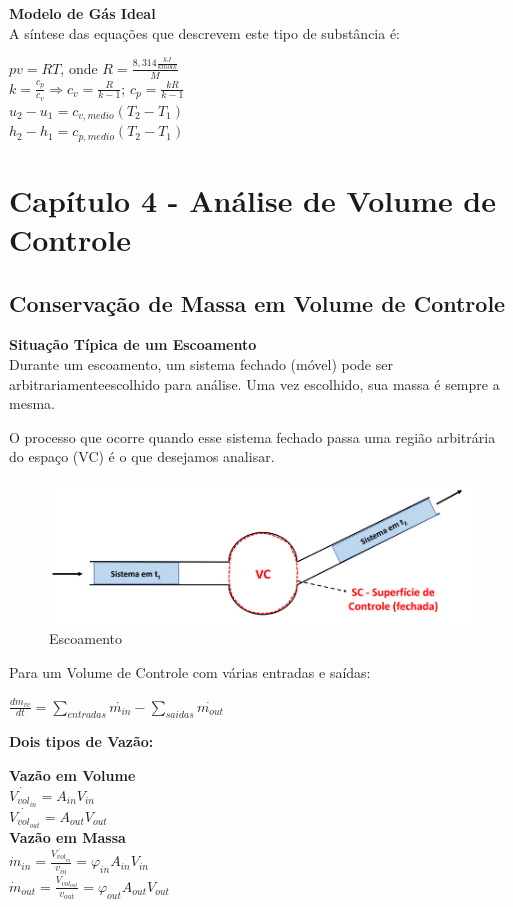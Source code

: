 \documentclass[a4paper, 12pt]{article}
\begin{document}
\textbf{Modelo de Gás Ideal}\\
A síntese das equações que descrevem este tipo de substância é:
	\begin{center}
		\large
		$ pv = RT $, onde $ R = \frac{8,314 \frac{kJ}{kmol k}}{M} $\\
		$ k = \frac{c_p}{c_v} \Rightarrow c_v = \frac{R}{k - 1} $; $c_p = \frac{kR}{k - 1} $\\
		$ u_2 - u_1 = c_{v,medio}(T_2-T_1) $\\
		$ h_2-h_1 = c_{p,medio}(T_2-T_1) $
	\end{center}


\newpage
\section{Capítulo 4 - Análise de Volume de Controle}
\subsection{Conservação de Massa em Volume de Controle}
\textbf{Situação Típica de um Escoamento}\\
Durante um escoamento, um sistema fechado (móvel) pode ser arbitrariamenteescolhido para análise. Uma vez escolhido, sua massa é sempre a mesma.

O processo que ocorre quando esse sistema fechado passa uma região arbitrária
do espaço (VC) é o que desejamos analisar.
	\begin{figure}[h]
		\includegraphics[width = 12cm]{vcc.png}
		\centering
		\caption{Escoamento}
	\end{figure}
	
Para um Volume de Controle com várias entradas e saídas:
	\begin{center}
		\large
		$ \frac{dm_{vc}}{dt} = \sum\limits_{entradas}\dot{m_{in}} - \sum\limits_{saidas}\dot{m_{out}}$
	\end{center}

\textbf{Dois tipos de Vazão:}\\
	\begin{center}
		\large
		\textbf{Vazão em Volume}\\
		$ \dot{V_{vol_{in}}} = A_{in}V_{in} $\\
		$ \dot{V_{vol_{out}}} = A_{out}V_{out} $\\
		
		\textbf{Vazão em Massa}\\
		$ \dot{m}_{in} = \frac{\dot{V_{vol_{in}}}}{v_{in}} = \varphi_{in}A_{in}V_{in} $\\
		$ \dot{m}_{out} = \frac{\dot{V_{vol_{out}}}}{v_{out}} = \varphi_{out}A_{out}V_{out} $
	\end{center}
\end{document}
